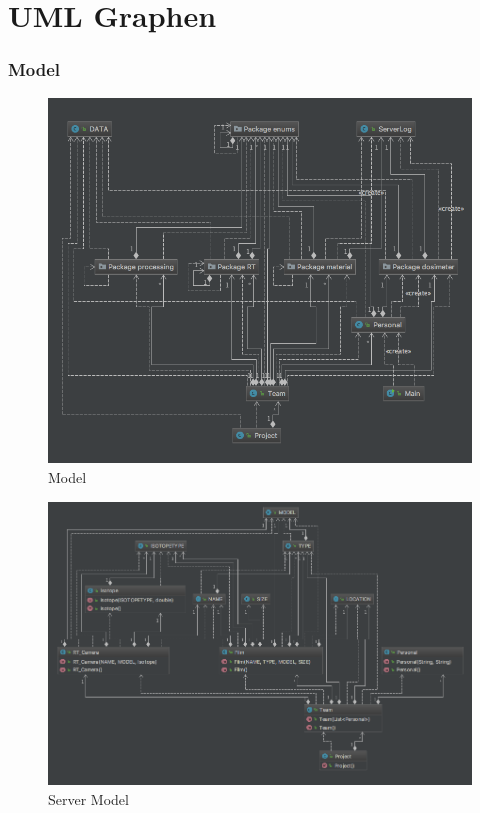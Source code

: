 \chapter{UML Graphen}
\subsection{Model}

\begin{figure}
\centering
\includegraphics[scale=0.6]{img/diagrams/modelDiagram.png}
 \caption{Model}
 \label{sec:model}
\end{figure}

\begin{figure}
\centering
\includegraphics[scale=0.6]{img/diagrams/software.png}
 \caption{Server Model}
 \label{sec:servermodel}
\end{figure}



